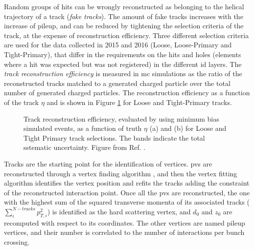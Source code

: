 Random groups of hits can be wrongly reconstructed as belonging to the helical trajectory of a track (\textit{fake tracks}). The amount of fake tracks increases with the increase of pileup, and can be reduced by tightening the selection criteria of the track, at the expense of reconstruction efficiency. Three different selection criteria are used for the data collected in 2015 and 2016 (Loose, Loose-Primary and Tight-Primary), that differ in the requirements on the hits and holes (elements where a hit was expected but was not registered) in the different \gls{id} layers. The \textit{track reconstruction efficiency} is measured in \gls{mc} simulations as the ratio of the reconstructed tracks matched to a generated charged particle over the total number of generated charged particles. The reconstruction efficiency as a function of the track $\eta$ and \pt is shown in Figure \ref{fig:obj:tracks} for Loose and Tight-Primary tracks.
 
\begin{figure}[ht]
\centering
{}
\caption{Track reconstruction efficiency, evaluated by using minimum bias simulated events, as a function of truth $\eta$ (a) and \pt (b) for Loose and Tight Primary track selections. The bands indicate the total sstematic uncertainty. Figure from Ref. \cite{ATL-PHYS-PUB-2015-051}.}
\label{fig:obj:tracks}
\end{figure}

Tracks are the starting point for the identification of vertices. \glspl{pv} are reconstructed through a vertex finding algorithm \cite{Fruhwirth:2007hz}, and then the vertex fitting algorithm identifies the vertex position and refits the tracks adding the constraint of the reconstructed interaction point. Once all the \glspl{pv} are reconstructed, the one with the highest sum of the squared transverse momenta of its associated tracks ($\sum_i^{N-tracks}p_{T,i}^2$) is identified as the hard scattering vertex, and $d_0$ and $z_0$ are recomputed with respect to its coordinates. The other vertices are named pileup vertices, and their number is correlated  to the number of interactions per bunch crossing.


